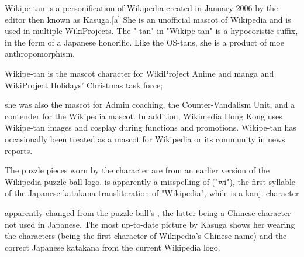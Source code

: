 Wikipe-tan  is a personification of Wikipedia created in January 2006 by the editor then known as Kasuga.[a] She is an unofficial mascot of Wikipedia and is used in multiple WikiProjects. The "-tan" in "Wikipe-tan" is a hypocoristic suffix, in the form of a Japanese honorific. Like the OS-tans, she is a product of moe anthropomorphism.

Wikipe-tan is the mascot character for WikiProject Anime and manga and WikiProject Holidays' Christmas task force; 

she was also the mascot for Admin coaching, the Counter-Vandalism Unit, and a contender for the Wikipedia mascot. In addition, Wikimedia Hong Kong uses Wikipe-tan images and cosplay during functions and promotions. Wikipe-tan has occasionally been treated as a mascot for Wikipedia or its community in news reports.

The puzzle pieces worn by the character are from an earlier version of the Wikipedia puzzle-ball logo.  is apparently a misspelling of  ("wi"), the first syllable of the Japanese katakana transliteration of "Wikipedia", while  is a kanji character 


apparently changed from the puzzle-ball's , the latter being a Chinese character not used in Japanese. The most up-to-date picture by Kasuga shows her wearing the characters  (being the first character of Wikipedia's Chinese name) and the correct Japanese katakana from the current Wikipedia logo.


